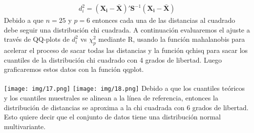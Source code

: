 \begin{sol}
\begin{itemize}
\begin{align*}
d_i^2=(\mathbf{X_i-\bar{X}})'\mathbf{S}^{-1}(\mathbf{X_i-\bar{X}})
\end{align*}
Debido a que $n=25$ y $p=6$ entonces cada una de las distancias al cuadrado debe seguir una distribución chi cuadrada. A continuación evaluaremos el ajuste a través de QQ-plots de $d_i^2$ vs $\chi_p^2$ mediante R, usando la función  mahalanobis para acelerar el proceso de sacar todas las distancias y la función qchisq para sacar los cuantiles de la distribución chi cuadrado con 4 grados de libertad. Luego graficaremos estos datos con la función qqplot. \\\\
\texttt{[image: img/17.png]}
\texttt{[image: img/18.png]}
Debido a que los cuantiles teóricos y los cuantiles muestrales se alinean a la línea de referencia, entonces la distribución de distancias se aproxima a la chi cuadrada con 6 grados de libertad. Esto quiere decir que el conjunto de datos tiene una distribución normal multivariante.\\

\end{itemize}
\end{sol}